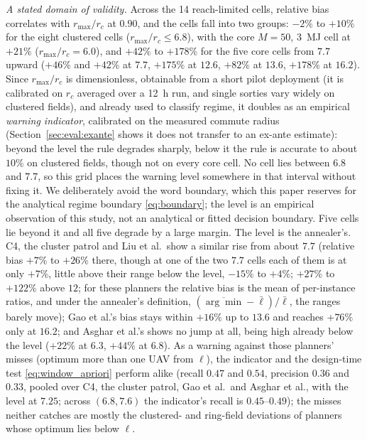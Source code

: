 \documentclass[journal,outdir=./]{IEEEtran}
\newcommand{\rmax}{r_{\max}}
\newcommand{\rc}{r_{c}}
\begin{document}
\textit{A stated domain of validity.} Across the 14 reach-limited cells, relative bias correlates with $\rmax/\rc$ at $0.90$, and the cells fall into two groups: $-2\%$ to $+10\%$ for the eight clustered cells ($\rmax/\rc\le6.8$), with the core $M=50$, 3~MJ cell at $+21\%$ ($\rmax/\rc=6.0$), and $+42\%$ to $+178\%$ for the five core cells from $7.7$ upward ($+46\%$ and $+42\%$ at $7.7$, $+175\%$ at $12.6$, $+82\%$ at $13.6$, $+178\%$ at $16.2$). Since $\rmax/\rc$ is dimensionless, obtainable from a short pilot deployment (it is calibrated on $\rc$ averaged over a 12~h run, and single sorties vary widely on clustered fields), and already used to classify regime, it doubles as an empirical \emph{warning indicator}, calibrated on the measured commute radius (Section~\ref{sec:eval:exante} shows it does not transfer to an ex-ante estimate): beyond the level the rule degrades sharply, below it the rule is accurate to about $10\%$ on clustered fields, though not on every core cell. No cell lies between $6.8$ and $7.7$, so this grid places the warning level somewhere in that interval without fixing it. We deliberately avoid the word boundary, which this paper reserves for the analytical regime boundary \eqref{eq:boundary}; the level is an empirical observation of this study, not an analytical or fitted decision boundary. Five cells lie beyond it and all five degrade by a large margin. The level is the annealer's. C4, the cluster patrol and Liu et al.\ show a similar rise from about $7.7$ (relative bias $+7\%$ to $+26\%$ there, though at one of the two $7.7$ cells each of them is at only $+7\%$, little above their range below the level, $-15\%$ to $+4\%$; $+27\%$ to $+122\%$ above $12$; for these planners the relative bias is the mean of per-instance ratios, and under the annealer's definition, $(\overline{\arg\min}-\bar\ell)/\bar\ell$, the ranges barely move); Gao et al.'s bias stays within $+16\%$ up to $13.6$ and reaches $+76\%$ only at $16.2$; and Asghar et al.'s shows no jump at all, being high already below the level ($+22\%$ at $6.3$, $+44\%$ at $6.8$). As a warning against those planners' misses (optimum more than one UAV from $\ell$), the indicator and the design-time test \eqref{eq:window_apriori} perform alike (recall $0.47$ and $0.54$, precision $0.36$ and $0.33$, pooled over C4, the cluster patrol, Gao et al.\ and Asghar et al., with the level at $7.25$; across $(6.8,7.6)$ the indicator's recall is $0.45$--$0.49$); the misses neither catches are mostly the clustered- and ring-field deviations of planners whose optimum lies below $\ell$.
\end{document}
